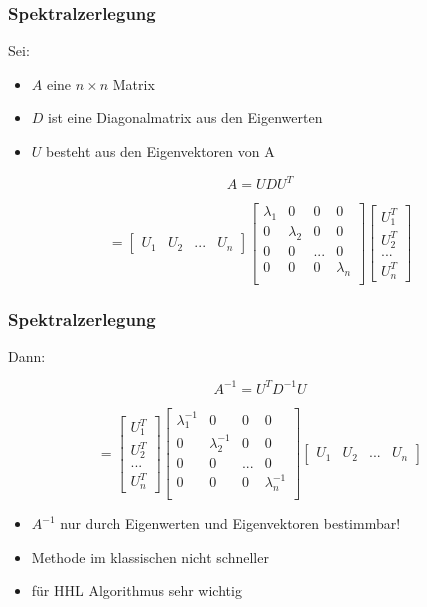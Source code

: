 \begin{frame}
    \frametitle{Spektralzerlegung}
    Sei: 
    \begin{itemize}
        \item   $A$ eine $n \times n$ Matrix
        \item   $D$ ist eine Diagonalmatrix aus den Eigenwerten
        \item   $U$ besteht aus den Eigenvektoren von A
   \end{itemize}

    \hfil

    $$A =  U D U^T$$

    $$= \begin{bmatrix} U_1&U_2&...&U_n \end{bmatrix}
    \begin{bmatrix} \lambda_1 & 0 & 0 & 0\\ 0 & \lambda_2 &0 & 0\\ 0 & 0 & ... & 0\\ 0 & 0 & 0& \lambda_n \\ \end{bmatrix}
    \begin{bmatrix} U_1^T\\ U_2^T\\ ...\\ U_n^T\end{bmatrix}$$


\end{frame}

\begin{frame}
    \frametitle{Spektralzerlegung}
    Dann:

    $$A^{-1}=  U^T D^{-1} U$$

    $$=\begin{bmatrix} U_1^T\\ U_2^T\\ ...\\ U_n^T\end{bmatrix}
    \begin{bmatrix} \lambda_1^{-1} & 0 & 0 & 0\\ 0 & \lambda_2^{-1} &0 & 0\\ 0 & 0 & ... & 0\\ 0 & 0 & 0& \lambda_n^{-1} \\ \end{bmatrix} 
    \begin{bmatrix} U_1&U_2&...&U_n \end{bmatrix}$$

    \hfil

    \begin{itemize}
        \item  $A^{-1}$ nur durch Eigenwerten und Eigenvektoren bestimmbar!
        \item  Methode im klassischen nicht schneller
        \item  für HHL Algorithmus sehr wichtig
   \end{itemize}
\end{frame}

